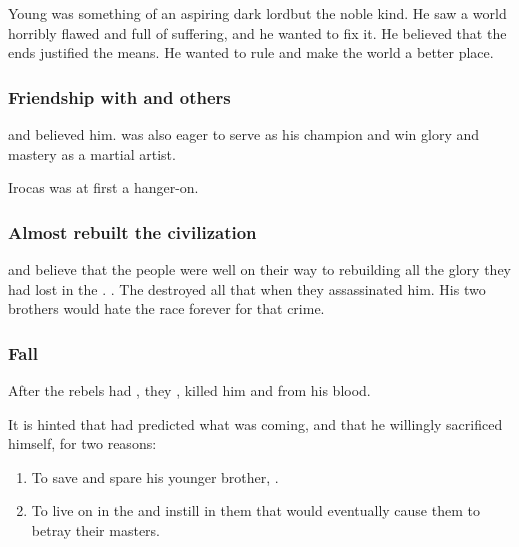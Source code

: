 Young \Raemyth was something of an aspiring dark lord\dash{}but the noble kind. He saw a world horribly flawed and full of suffering, and he wanted to fix it. He believed that the ends justified the means. He wanted to rule and make the world a better place. 






\subsubsection{Friendship with \Quessanth and others}
\Quessanth and  believed him. 
\Quessanth was also eager to serve as his champion and win glory and mastery as a martial artist. 

Irocas was at first a hanger-on. 







\subsubsection{Almost rebuilt the \draconian{} civilization}
\Secherdamon{} and \Ishnaruchaefir{} believe that the \draconian{} people were well on their way to rebuilding all the glory they had lost in the \firstbanewar. 
. 
The \resphain{} destroyed all that when they assassinated him. 
His two brothers would hate the \resphan race forever for that crime. 





\subsubsection{Fall}
After the \resphan{} rebels had , they , killed him and  from his blood.

It is hinted that \Nexagglachel{} had predicted what was coming, and that he willingly sacrificed himself, for two reasons:

\begin{enumerate}
 \item To save and spare his younger brother, \Ishnaruchaefir.
 \item To live on in the \resphain{} and instill in them  that would eventually cause them to betray their masters. 
\end{enumerate}

